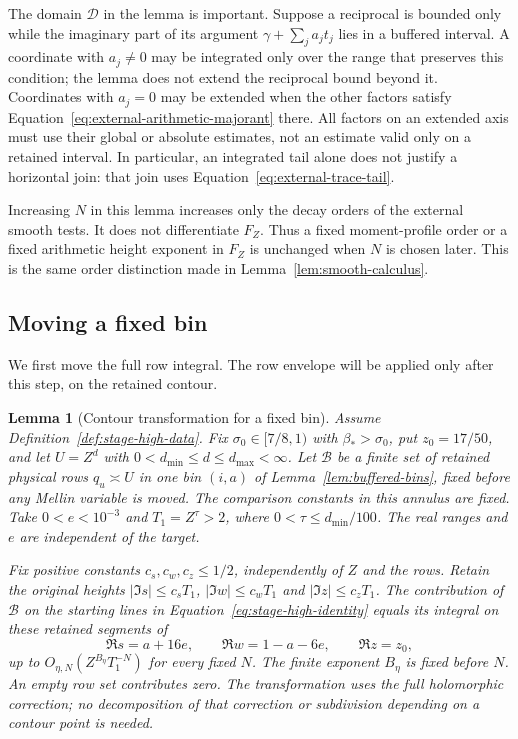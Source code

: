 \documentclass[11pt,a4paper]{article}
\numberwithin{equation}{section}
\numberwithin{figure}{section}
\newtheorem{lemma}[theorem]{Lemma}
\theoremstyle{definition}
\theoremstyle{remark}
\begin{document}
The domain $\mathcal D$ in the lemma is important.  Suppose a reciprocal
is bounded only while the imaginary part of its argument
$\gamma+\sum_j a_jt_j$ lies in a buffered interval.  A coordinate with
$a_j\ne0$ may be integrated only over the range that preserves this
condition; the lemma does not extend the reciprocal bound beyond it.
Coordinates with $a_j=0$ may be extended when the other factors satisfy
Equation~\eqref{eq:external-arithmetic-majorant} there.  All factors on an
extended axis must use their global or absolute estimates, not an estimate
valid only on a retained interval.  In particular, an integrated tail alone
does not justify a horizontal join: that join uses
Equation~\eqref{eq:external-trace-tail}.

Increasing $N$ in this lemma increases only the decay orders of the external
smooth tests.  It does not differentiate $F_Z$.  Thus a fixed moment-profile
order or a fixed arithmetic height exponent in $F_Z$ is unchanged when $N$
is chosen later.  This is the same order distinction made in
Lemma~\ref{lem:smooth-calculus}.

\subsection{Moving a fixed bin}

We first move the full row integral.  The row envelope will be applied only
after this step, on the retained contour.

\begin{lemma}[Contour transformation for a fixed bin]
\label{lem:fixed-bin-contour}
Assume Definition~\ref{def:stage-high-data}.  Fix
$\sigma_0\in[7/8,1)$ with $\beta_*>\sigma_0$, put $z_0=17/50$, and let
$U=Z^d$ with $0<d_{\min}\le d\le d_{\max}<\infty$.
Let $\mathcal B$ be a finite set of retained physical rows $q_u\asymp U$
in one bin $(i,a)$ of Lemma~\ref{lem:buffered-bins}, fixed before any
Mellin variable is moved.  The comparison constants in this annulus are
fixed.  Take $0<e<10^{-3}$ and $T_1=Z^\tau>2$, where
$0<\tau\le d_{\min}/100$.  The real ranges and $e$ are independent of the
target.

Fix positive constants $c_s,c_w,c_z\le1/2$, independently of $Z$ and the
rows.  Retain the original heights
$|\Im s|\le c_sT_1$, $|\Im w|\le c_wT_1$ and
$|\Im z|\le c_zT_1$.  The contribution of $\mathcal B$ on the starting
lines in Equation~\eqref{eq:stage-high-identity} equals its integral on
these retained segments of
\begin{equation}
 \Re s=a+16e,\qquad \Re w=1-a-6e,\qquad \Re z=z_0,
 \label{eq:stage-central-contours}
\end{equation}
up to $O_{\eta,N}(Z^{B_\eta}T_1^{-N})$ for every fixed $N$.  The finite
exponent $B_\eta$ is fixed before $N$.  An empty row set contributes zero.
The transformation uses the full holomorphic correction; no decomposition
of that correction or subdivision depending on a contour point is needed.
\end{lemma}
\end{document}

